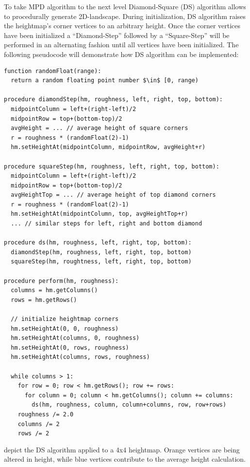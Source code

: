 \documentclass[11pt,a4paper,twoside,openright]{report}
\begin{document}
\noindent To take MPD algorithm to the next level Diamond-Square (DS) algorithm allows to procedurally generate 2D-landscape. During initialization, DS algorithm raises the heightmap's corner vertices to an arbitrary height. Once the corner vertices have been initialized a ``Diamond-Step'' followed by a ``Square-Step'' will be performed in an alternating fashion until all vertices have been initialized. The following pseudocode will demonstrate how DS algorithm can be implemented:

\begin{lstlisting}[caption=DS pseudocode, mathescape=true]
function randomFloat(range):
  return a random floating point number $\in$ [0, range)

procedure diamondStep(hm, roughness, left, right, top, bottom):
  midpointColumn = left+(right-left)/2
  midpointRow = top+(bottom-top)/2
  avgHeight = ... // average height of square corners
  r = roughness * (randomFloat(2)-1)
  hm.setHeightAt(midpointColumn, midpointRow, avgHeight+r)

procedure squareStep(hm, roughness, left, right, top, bottom):
  midpointColumn = left+(right-left)/2
  midpointRow = top+(bottom-top)/2
  avgHeightTop = ... // average height of top diamond corners
  r = roughness * (randomFloat(2)-1)
  hm.setHeightAt(midpointColumn, top, avgHeightTop+r)
  ... // similar steps for left, right and bottom diamond

procedure ds(hm, roughness, left, right, top, bottom):
  diamondStep(hm, roughness, left, right, top, bottom)
  squareStep(hm, roughtness, left, right, top, bottom)

procedure perform(hm, roughness):
  columns = hm.getColumns()
  rows = hm.getRows()

  // initialize heightmap corners
  hm.setHeightAt(0, 0, roughness)
  hm.setHeightAt(columns, 0, roughness)
  hm.setHeightAt(0, rows, roughness)
  hm.setHeightAt(columns, rows, roughness)

  while columns > 1:
    for row = 0; row < hm.getRows(); row += rows:
      for column = 0; column < hm.getColumns(); column += columns:
        ds(hm, roughness, column, column+columns, row, row+rows)
    roughness /= 2.0
    columns /= 2
    rows /= 2
\end{lstlisting}

\noindent {} depict the DS algorithm applied to a 4x4 heightmap. Orange vertices are being altered in height, while blue vertices contribute to the average height calculation.
\end{document}
